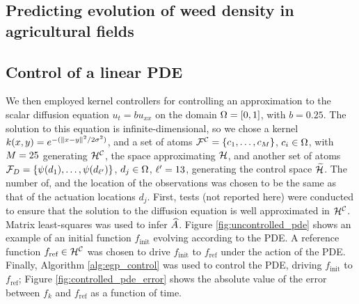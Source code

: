 \subsection{Predicting evolution of weed density in agricultural fields}\label{sec:weed}



\subsection{Control of a linear PDE} %
We then employed kernel controllers for controlling an approximation to the scalar diffusion equation $u_t = bu_{xx}$ on the domain $\Omega=[0,1]$, with $b=0.25$. The solution to this equation is infinite-dimensional, so we chose a kernel $k(x,y) = e^{-(\|x-y\|^2/2\sigma^2)}$, and a set of atoms  $\mathcal{F}^{\mathcal{C}}=\{c_1,\dots,c_{M}\}$, $c_i\in\Omega$, with $M = 25$ generating $\mathcal{H}^{\mathcal{C}}$, the space approximating $\mathcal{H}$, and another set of atoms $\mathcal{F}_{D}=\{\psi(d_1),\dots,\psi(d_{\ell'})\}$, $d_j\in\Omega$,
$\ell'=13$, generating the control space $\widetilde{\mathcal{H}}$. The number of, and the location of the observations was chosen to be the same as that of the actuation locations $d_j$. First, tests (not reported here) were conducted to ensure that the solution to the diffusion equation is well approximated in $\mathcal{H}^{\mathcal{C}}$. Matrix least-squares was used to infer $\widehat{A}$. Figure \ref{fig:uncontrolled_pde} shows an example of an initial function $f_{\text{init}}$ evolving according to the PDE.  A reference function $f_{\text{ref}}\in\mathcal{H}^{\mathcal{C}}$ was chosen to drive $f_{\text{init}}$ to $f_{\text{ref}}$ under the action of the PDE. Finally, Algorithm \ref{alg:egp_control} was used to control the PDE, driving $f_{\text{init}}$ to $f_{\text{ref}}$; Figure \ref{fig:controlled_pde_error} shows the absolute value of the error between $f_k $ and $f_{\text{ref}}$ as a function of time. 

